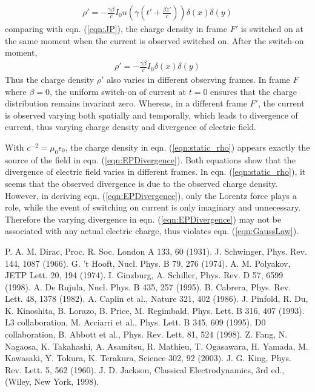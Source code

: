 \documentclass[prd,showpacs,twocolumn]{revtex4-1}
\begin{document}
\begin{eqnarray}
\rho'=-\frac{\gamma\beta}{c} I_0u(\gamma(t'+\frac{\beta z'}{c}))\delta(x)\delta(y)
\label{eqn:rho}
\end{eqnarray}
comparing with eqn. (\ref{eqn:JP}), the charge density in frame $F'$ is switched on at the same moment when the current is observed switched on. After the switch-on moment,
\begin{eqnarray}
\rho'=-\frac{\gamma\beta}{c} I_0\delta(x)\delta(y)
\label{eqn:static_rho}
\end{eqnarray}
Thus the charge density $\rho'$ also varies in different observing frames. In frame $F$ where $\beta=0$, the uniform switch-on of current at $t=0$ ensures that the charge distribution remains invariant zero. Whereas, in a different frame $F'$, the current is observed varying both spatially and temporally, which leads to divergence of current, thus varying charge density and divergence of electric field.

With $c^{-2}=\mu_0\epsilon_0$, the charge density in eqn. (\ref{eqn:static_rho}) appears exactly the source of the field in eqn. (\ref{eqn:EPDivergence}). Both equations show that the divergence of electric field varies in different frames. In eqn. (\ref{eqn:static_rho}), it seems that the observed divergence is due to the observed charge density. However, in deriving eqn. (\ref{eqn:EPDivergence}), only the Lorentz force plays a role, while the event of switching on current is only imaginary and unnecessary. Therefore the varying divergence in eqn. (\ref{eqn:EPDivergence}) may not be associated with any actual electric charge, thus violates eqn. (\ref{eqn:GaussLaw}).


\begin{thebibliography}{0}
\label{sec:TeXbooks}
 P. A. M. Dirac, Proc. R. Soc. London A 133, 60 (1931).
 J. Schwinger, Phys. Rev. 144, 1087 (1966).
 G. 't Hooft, Nucl. Phys. B 79, 276 (1974).
 A. M. Polyakov, JETP Lett. 20, 194 (1974).
 I. Ginzburg, A. Schiller, Phys. Rev. D 57, 6599 (1998).
 A. De Rujula, Nucl. Phys. B 435, 257 (1995).
 B. Cabrera, Phys. Rev. Lett. 48, 1378 (1982).
 A. Caplin et al., Nature 321, 402 (1986).
 J. Pinfold, R. Du, K. Kinoshita, B. Lorazo, B. Price, M. Regimbald, Phys. Lett. B 316, 407 (1993).
 L3 collaboration, M. Acciarri et al., Phys. Lett. B 345, 609 (1995).
 D0 collaboration, B. Abbott et al., Phys. Rev. Lett. 81, 524 (1998).
 Z. Fang, N. Nagaosa, K. Takahashi, A. Asamitsu, R. Mathieu, T. Ogasawara, H. Yamada, M. Kawasaki, Y. Tokura, K. Terakura, Science 302, 92 (2003).
 J. G. King, Phys. Rev. Lett. 5, 562 (1960).
 J. D. Jackson, Classical Electrodynamics, 3rd ed., (Wiley, New York, 1998).
\end{thebibliography}
\end{document}
